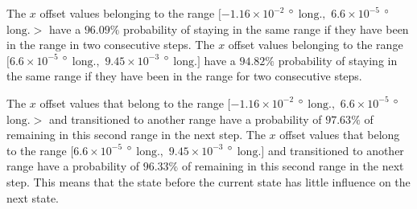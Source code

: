 \documentclass[preprint,12pt]{elsarticle}
\begin{document}
The $x$ offset values belonging to the range $[-1.16 \times 10^{-2}$ $\degree$ $\mathrm{long.},$ $6.6 \times 10^{-5}$ $\degree$ $\mathrm{long.}>$ have a $96.09\%$ probability of staying in the same range if they have been in the range in two consecutive steps. The $x$ offset values belonging to the range $[6.6 \times 10^{-5}$ $\degree$ $\mathrm{long.},$ $9.45 \times 10^{-3}$ $\degree$ $\mathrm{long.}]$ have a $94.82\%$ probability of staying in the same range if they have been in the range for two consecutive steps.

The $x$ offset values that belong to the range $[-1.16 \times 10^{-2}$ $\degree$ $\mathrm{long.},$ $6.6 \times 10^{-5}$ $\degree$ $\mathrm{long.}>$ and transitioned to another range have a probability of $97.63\%$ of remaining in this second range in the next step. The $x$ offset values that belong to the range $[6.6 \times 10^{-5}$ $\degree$ $\mathrm{long.},$ $9.45 \times 10^{-3}$ $\degree$ $\mathrm{long.}]$ and transitioned to another range have a probability of $96.33\%$ of remaining in this second range in the next step. This means that the state before the current state has little influence on the next state.
\end{document}
